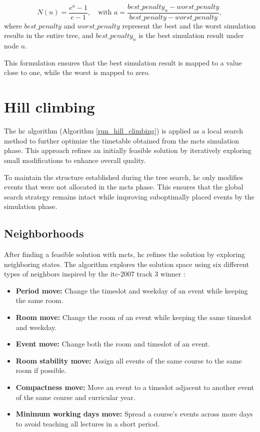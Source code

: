 \begin{equation}
N(n) = \frac{e^a - 1}{e - 1}, \quad \text{with } a = \frac{best\_penalty_n - worst\_penalty}{ best\_penalty - worst\_penalty},\label{normalization_formula}
\end{equation}
where \(best\_penalty\) and \(worst\_penalty\) represent the best and the worst simulation results in the entire tree, and \(best\_penalty_n\) is the best simulation result under node \(n\).

This formulation ensures that the best simulation result is mapped to a value close to one, while the worst is mapped to zero.

\section{Hill climbing}\label{hill_climbing_section}

The \ac{hc} algorithm (Algorithm \ref{run_hill_climbing}) is applied as a local search method to further optimize the timetable obtained from the \ac{mcts} simulation phase. This approach refines an initially feasible solution by iteratively exploring small modifications to enhance overall quality.

To maintain the structure established during the tree search, \ac{hc} only modifies events that were not allocated in the \ac{mcts} phase. This ensures that the global search strategy remains intact while improving suboptimally placed events by the simulation phase.

\subsection{Neighborhoods}

After finding a feasible solution with \ac{mcts}, \ac{hc} refines the solution by exploring neighboring states. The algorithm explores the solution space using six different types of neighbors inspired by the \ac{itc-2007} track 3 winner \cite{muller_itc2007}:

\begin{itemize}
\item \textbf{Period move:} Change the timeslot and weekday of an event while keeping the same room.
\item \textbf{Room move:} Change the room of an event while keeping the same timeslot and weekday.
\item \textbf{Event move:} Change both the room and timeslot of an event.
\item \textbf{Room stability move:} Assign all events of the same course to the same room if possible.
\item \textbf{Compactness move:} Move an event to a timeslot adjacent to another event of the same course and curricular year.
\item \textbf{Minimum working days move:} Spread a course's events across more days to avoid teaching all lectures in a short period.
\end{itemize}

